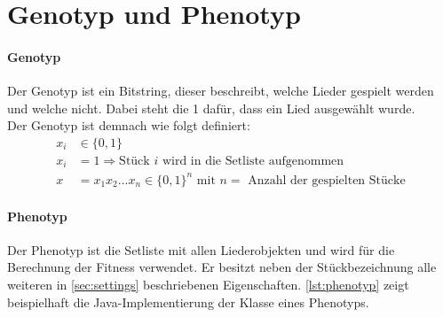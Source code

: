 \section{Genotyp und Phenotyp}\label{sec:genotypPhenotyp}
\paragraph{Genotyp}
Der Genotyp ist ein Bitstring, dieser beschreibt, welche Lieder gespielt werden und welche nicht.
Dabei steht die 1 dafür, dass ein Lied ausgewählt wurde. \\
Der Genotyp ist demnach wie folgt definiert: 
\begin{equation}
    \label{eqn:genotyp}
    \begin{split}
        x_i &\in \{ 0,1 \} \\
        x_i &= 1 \Rightarrow \text{Stück $i$ wird in die Setliste aufgenommen} \\
        x   &= x_1x_2...x_n \in \{0,1\}^n\text{ mit $n = $ Anzahl der gespielten Stücke}
    \end{split}
\end{equation}

\paragraph{Phenotyp}
Der Phenotyp ist die Setliste mit allen Liederobjekten und wird für die
Berechnung der Fitness verwendet.
Er besitzt neben der Stückbezeichnung alle weiteren in \autoref{sec:settings}
beschriebenen Eigenschaften. \autoref{lst:phenotyp} zeigt beispielhaft die Java-Implementierung der Klasse
eines Phenotyps.


